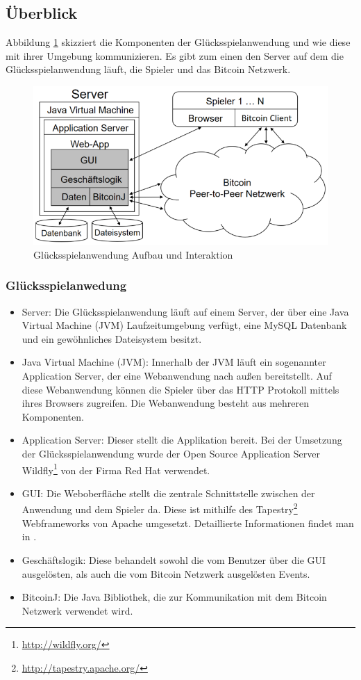 \subsection{Überblick}

Abbildung \ref{fig:anwendung_aufbau} skizziert die Komponenten der Glücksspielanwendung und wie diese mit ihrer Umgebung kommunizieren. Es gibt zum einen den Server auf dem die Glücksspielanwendung läuft, die Spieler und das Bitcoin Netzwerk.

\begin{figure}[H]
\centering
\includegraphics[width=1\linewidth]{Figures/umsetzung_btc/anwendung_aufbau}
\decoRule
\caption{Glücksspielanwendung Aufbau und Interaktion}
\label{fig:anwendung_aufbau}
\end{figure}

\subsubsection{Glücksspielanwedung}
\begin{itemize}
\item Server: Die Glücksspielanwendung läuft auf einem Server, der über eine Java Virtual Machine (JVM) Laufzeitumgebung verfügt, eine MySQL Datenbank und ein gewöhnliches Dateisystem besitzt.
\item Java Virtual Machine (JVM): Innerhalb der JVM läuft ein sogenannter Application Server, der eine Webanwendung nach außen bereitstellt. Auf diese Webanwendung können die Spieler über das HTTP Protokoll mittels ihres Browsers zugreifen. Die Webanwendung besteht aus mehreren Komponenten.
\item Application Server: Dieser stellt die Applikation bereit. Bei der Umsetzung der Glücksspielanwendung wurde der Open Source Application Server Wildfly\footnote{\url{http://wildfly.org/}} von der Firma Red Hat verwendet.
\item GUI: Die Weboberfläche stellt die zentrale Schnittstelle zwischen der Anwendung und dem Spieler da. Diese ist mithilfe des Tapestry\footnote{\url{http://tapestry.apache.org/}} Webframeworks von Apache umgesetzt. Detaillierte Informationen findet man in \cite{tapestry}.
\item Geschäftslogik: Diese behandelt sowohl die vom Benutzer über die GUI ausgelösten, als auch die vom Bitcoin Netzwerk ausgelösten Events.
\item BitcoinJ: Die Java Bibliothek, die zur Kommunikation mit dem Bitcoin Netzwerk verwendet wird.
\end{itemize}

